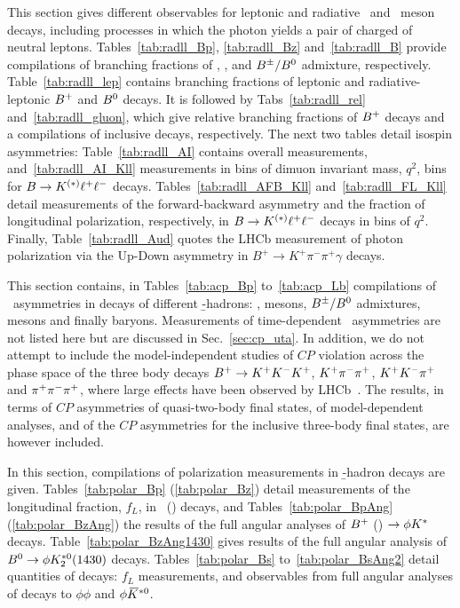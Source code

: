 This section gives different observables for leptonic and radiative \Bz\ and \Bp\ meson decays, including processes in which the photon yields a pair of charged of neutral leptons. Tables~\ref{tab:radll_Bp}, \ref{tab:radll_Bz} and~\ref{tab:radll_B} provide compilations of branching fractions of \Bp, \Bz, and $B^\pm/B^0$ admixture, respectively.
Table~\ref{tab:radll_lep} contains branching fractions of leptonic and radiative-leptonic $B^{+}$ and $B^0$ decays. It is followed by Tabs~\ref{tab:radll_rel} and~\ref{tab:radll_gluon}, which give relative branching fractions of $B^{+}$ decays and a compilations of inclusive decays, respectively. The next two tables detail isospin asymmetries: Table~\ref{tab:radll_AI} contains overall measurements, and~\ref{tab:radll_AI_Kll} measurements in bins of dimuon invariant mass, $q^2$, bins for $B\to K^{(\ast)}\ell^+\ell^-$ decays. Tables~\ref{tab:radll_AFB_Kll} and~\ref{tab:radll_FL_Kll} detail measurements of the forward-backward asymmetry and the fraction of longitudinal polarization, respectively, in $B\to K^{(\ast)}\ell^+\ell^-$ decays in bins of $q^2$. Finally, Table~\ref{tab:radll_Aud} quotes the LHCb measurement of photon polarization via the Up-Down asymmetry in $B^+ \to K^+ \pi^- \pi^+ \gamma$ decays.



\clearpage

\label{sec:rare-acp}

This section contains, in Tables~\ref{tab:acp_Bp} to~\ref{tab:acp_Lb}
compilations of \CP\ asymmetries in decays of different \b-hadrons: \Bp, \Bz
mesons, $B^\pm/B^0$ admixtures, \Bs mesons and finally \Lb baryons.
Measurements of time-dependent \CP\ asymmetries are not listed here but are
discussed in Sec.~\ref{sec:cp_uta}.
In addition, we do not attempt to include the model-independent studies of
$CP$ violation across the phase space of the three body decays $B^{+} \to
K^+K^-K^+$, $K^+\pi^-\pi^+$, $K^+K^-\pi^+$ and $\pi^+\pi^-\pi^+$, where large
effects have been observed by LHCb~\cite{Aaij:2013sfa,Aaij:2013bla,Aaij:2014iva}.
The results, in terms of $CP$ asymmetries of quasi-two-body final states, of
model-dependent analyses, and of the $CP$ asymmetries for the inclusive
three-body final states, are however included.


\clearpage

\label{sec:rare-polar}

In this section, compilations of polarization measurements in \b-hadron decays
are given. Tables~\ref{tab:polar_Bp} (\ref{tab:polar_Bz}) detail measurements
of the longitudinal fraction, $f_L$, in \Bp\ (\Bz) decays, and
Tables~\ref{tab:polar_BpAng} (\ref{tab:polar_BzAng}) the results of the full
angular analyses of $B^{+}$ (\Bz) $\to\phi K^*$ decays. 
Table~\ref{tab:polar_BzAng1430} gives results of the full angular analysis of
$B^0\to\phi K_2^{\ast 0}(1430)$ decays. 
Tables~\ref{tab:polar_Bs} to~\ref{tab:polar_BsAng2} detail quantities of \Bs decays: $f_L$ measurements, and observables from full angular analyses of decays to $\phi\phi$ and $\phi\kern 0.2em\overline{\kern -0.2em K}{}^{*0}$.



